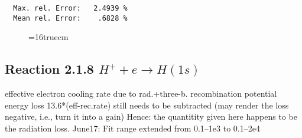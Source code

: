 \documentclass[12pt,dvipdfmx]{article}
\begin{document}
\begin{small}
\begin{verbatim}
  Max. rel. Error:   2.4939 %
  Mean rel. Error:    .6828 %

\end{verbatim}\end{small}
\begin{figure} \label{2.1.5io}
\epsfxsize=16truecm
\end{figure}
\newpage

\subsection{
  Reaction 2.1.8  $H^+ + e  \rightarrow H(1s) $
}

   effective electron cooling rate due to rad.+three-b. recombination
   potential energy loss 13.6*(eff-rec.rate) still needs to be
   subtracted (may render the loss negative, i.e., turn it into a gain)
   Hence: the quantitity given here happens to be the radiation loss.
   June17: Fit range extended from 0.1--1e3 to 0.1--2e4
\end{document}
